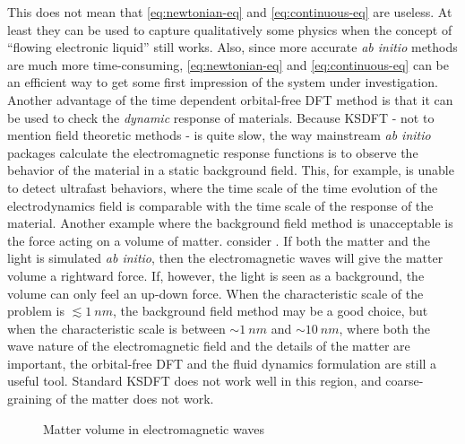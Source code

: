 \documentclass[hyperref, a4paper]{article}
\begin{document}
This does not mean that \eqref{eq:newtonian-eq} and \eqref{eq:continuous-eq} are useless.
At least they can be used to capture qualitatively some physics when the concept of ``flowing electronic liquid'' still works.
Also, since more accurate \emph{ab initio} methods are much more time-consuming, \eqref{eq:newtonian-eq} and \eqref{eq:continuous-eq} can be an efficient way to get some first impression of the system under investigation.
Another advantage of the time dependent orbital-free DFT method is that it can be used to check the \emph{dynamic} response of materials.
Because KSDFT - not to mention field theoretic methods - is quite slow, the way mainstream \emph{ab initio} packages calculate the electromagnetic response functions is to observe the behavior of the material in a static background field.
This, for example, is unable to detect ultrafast behaviors, where the time scale of the time evolution of the electrodynamics field is comparable with the time scale of the response of the material.
Another example where the background field method is unacceptable is the force acting on a volume of matter.
consider . If both the matter and the light is simulated \emph{ab initio}, then the electromagnetic waves will give the matter volume a rightward force.
If, however, the light is seen as a background, the volume can only feel an up-down force.
When the characteristic scale of the problem is $\lesssim \SI{1}{nm}$, the background field method may be a good choice, but when the characteristic scale is between $\sim \SI{1}{nm}$ and $\sim \SI{10}{nm}$, where both the wave nature of the electromagnetic field and the details of the matter are important, the orbital-free DFT and the fluid dynamics formulation are still a useful tool.
Standard KSDFT does not work well in this region, and coarse-graining of the matter does not work.

\begin{figure}
    \centering
    
    \caption{Matter volume in electromagnetic waves}
    \label{fig:em-wave-volume}
\end{figure}
\end{document}
